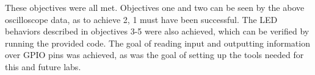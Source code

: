 \documentclass[sigconf]{article}
\begin{document}
These objectives were all met. Objectives one and two can be seen by the above oscilloscope data, as to achieve 2, 1 must have been successful. The LED behaviors described in objectives 3-5 were also achieved, which can be verified by running the provided code. The goal of reading input and outputting information over GPIO pins was achieved, as was the goal of setting up the tools needed for this and future labs.




\end{document}
